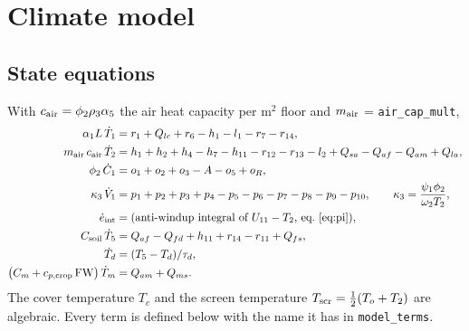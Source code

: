 \documentclass[11pt,a4paper]{article}
\newcommand{\code}[1]{\texttt{#1}}
\begin{document}
\section{Climate model}\label{sec:climate}
\subsection{State equations}
With $c_{\rm air}=\phi_2\rho_3\alpha_5$ the air heat capacity per m$^2$ floor and $m_{\rm air}$ = \code{air\_cap\_mult},
\begin{align}
\alpha_1 L\,\dot T_1 &= r_1 + Q_{lc} + r_6 - h_1 - l_1 - r_7 - r_{14},\label{eq:T1}\\
m_{\rm air}\,c_{\rm air}\,\dot T_2 &= h_1 + h_2 + h_4 - h_7 - h_{11} - r_{12} - r_{13} - l_2 + Q_{sa} - Q_{af} - Q_{am} + Q_{la},\label{eq:T2}\\
\phi_2\,\dot C_1 &= o_1 + o_2 + o_3 - A - o_5 + o_R,\label{eq:C1}\\
\kappa_3\,\dot V_1 &= p_1 + p_2 + p_3 + p_4 - p_5 - p_6 - p_7 - p_8 - p_9 - p_{10},\qquad \kappa_3=\frac{\psi_1\phi_2}{\omega_2T_2},\label{eq:V1}\\
\dot e_{\rm int} &= \text{(anti-windup integral of } U_{11}-T_2\text{, eq.~\ref{eq:pi})},\\
C_{\rm soil}\,\dot T_5 &= Q_{af} - Q_{fd} + h_{11} + r_{14} - r_{11} + Q_{fs},\label{eq:T5}\\
\dot T_d &= (T_5-T_d)/\tau_d,\\
\bigl(C_m + c_{p,\rm crop}\,\mathrm{FW}\bigr)\,\dot T_m &= Q_{am} + Q_{ms}.\label{eq:Tm}
\end{align}
The cover temperature $T_c$ and the screen temperature $T_{\rm scr}=\tfrac12(T_o+T_2)$ are algebraic. Every term is defined
below with the name it has in \code{model\_terms}.
\end{document}
